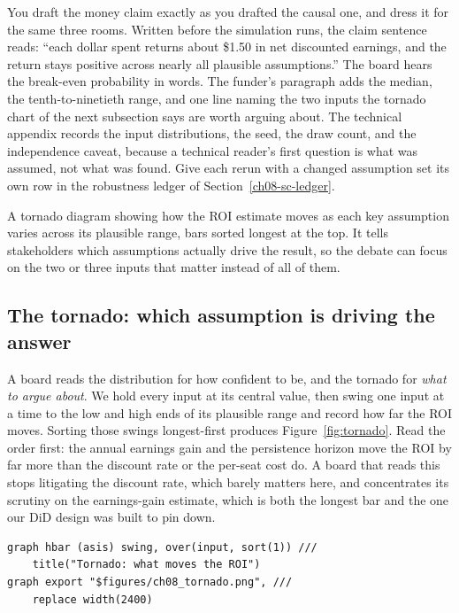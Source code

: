 \documentclass[
    a4paper,
    fontsize=10pt,
    twoside=true,
    numbers=noenddot,
]{kaobook}
\newenvironment{vizcallout}[1][Visualization to build]{%
    \begin{vizbox}[frametitle={#1}]%
}{%
    \end{vizbox}%
}
\begin{document}
You draft the money claim exactly as you drafted the causal one, and dress it for the same three rooms. Written before the simulation runs, the claim sentence reads: \enquote{each dollar spent returns about \$1.50 in net discounted earnings, and the return stays positive across nearly all plausible assumptions.} The board hears the break-even probability in words. The funder's paragraph adds the median, the tenth-to-ninetieth range, and one line naming the two inputs the tornado chart of the next subsection says are worth arguing about. The technical appendix records the input distributions, the seed, the draw count, and the independence caveat, because a technical reader's first question is what was assumed, not what was found. Give each rerun with a changed assumption set its own row in the robustness ledger of Section~\ref{ch08-sc-ledger}.

\begin{vizcallout}[Visualization to build: the tornado chart]
A tornado diagram showing how the ROI estimate moves as each key assumption varies across its plausible range, bars sorted longest at the top. It tells stakeholders which assumptions actually drive the result, so the debate can focus on the two or three inputs that matter instead of all of them.
\end{vizcallout}

\subsection{The tornado: which assumption is driving the answer}
A board reads the distribution for how confident to be, and the tornado for \emph{what to argue about}. We hold every input at its central value, then swing one input at a time to the low and high ends of its plausible range and record how far the ROI moves. Sorting those swings longest-first produces Figure~\ref{fig:tornado}. Read the order first: the annual earnings gain and the persistence horizon move the ROI by far more than the discount rate or the per-seat cost do. A board that reads this stops litigating the discount rate, which barely matters here, and concentrates its scrutiny on the earnings-gain estimate, which is both the longest bar and the one our DiD design was built to pin down.

\par
{\footnotesize
\begin{verbatim}
graph hbar (asis) swing, over(input, sort(1)) ///
    title("Tornado: what moves the ROI")
graph export "$figures/ch08_tornado.png", ///
    replace width(2400)
\end{verbatim}
}
\end{document}
